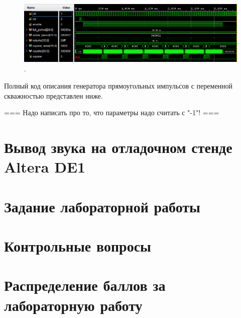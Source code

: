 \begin{figure}[H]
	\centering
	\includegraphics [width=1\textwidth] {images/lab_7/square_simulate2.PNG}
	\caption{.}
	\label{lab7:pic6}
\end{figure}

Полный код описания генератора прямоугольных импульсов с переменной скважностью представлен ниже.


\noindent
\begin{minipage}{\linewidth}
	
\end{minipage}


=== Надо написать про то, что параметры надо считать с "-1"! ===






\section{Вывод звука на отладочном стенде Altera DE1}


\section{Задание лабораторной работы}

\section{Контрольные вопросы}

\section{Распределение баллов за лабораторную работу}